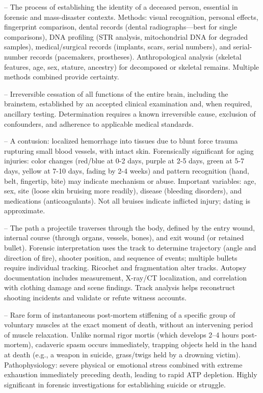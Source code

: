 -- The process of establishing the identity of a deceased person, essential in forensic and mass-disaster contexts. Methods: visual recognition, personal effects, fingerprint comparison, dental records (dental radiographs—best for single comparisons), DNA profiling (STR analysis, mitochondrial DNA for degraded samples), medical/surgical records (implants, scars, serial numbers), and serial-number records (pacemakers, prostheses). Anthropological analysis (skeletal features, age, sex, stature, ancestry) for decomposed or skeletal remains. Multiple methods combined provide certainty.

-- Irreversible cessation of all functions of the entire brain, including the brainstem, established by an accepted clinical examination and, when required, ancillary testing. Determination requires a known irreversible cause, exclusion of confounders, and adherence to applicable medical standards.

-- A contusion: localized hemorrhage into tissues due to blunt force trauma rupturing small blood vessels, with intact skin. Forensically significant for aging injuries: color changes (red/blue at 0-2 days, purple at 2-5 days, green at 5-7 days, yellow at 7-10 days, fading by 2-4 weeks) and pattern recognition (hand, belt, fingertip, bite) may indicate mechanism or abuse. Important variables: age, sex, site (loose skin bruising more readily), disease (bleeding disorders), and medications (anticoagulants). Not all bruises indicate inflicted injury; dating is approximate.

-- The path a projectile traverses through the body, defined by the entry wound, internal course (through organs, vessels, bones), and exit wound (or retained bullet). Forensic interpretation uses the track to determine trajectory (angle and direction of fire), shooter position, and sequence of events; multiple bullets require individual tracking. Ricochet and fragmentation alter tracks. Autopsy documentation includes measurement, X-ray/CT localization, and correlation with clothing damage and scene findings. Track analysis helps reconstruct shooting incidents and validate or refute witness accounts.

-- Rare form of instantaneous post-mortem stiffening of a specific group of voluntary muscles at the exact moment of death, without an intervening period of muscle relaxation. Unlike normal rigor mortis (which develops 2--4 hours post-mortem), cadaveric spasm occurs immediately, trapping objects held in the hand at death (e.g., a weapon in suicide, grass/twigs held by a drowning victim). Pathophysiology: severe physical or emotional stress combined with extreme exhaustion immediately preceding death, leading to rapid ATP depletion. Highly significant in forensic investigations for establishing suicide or struggle.

